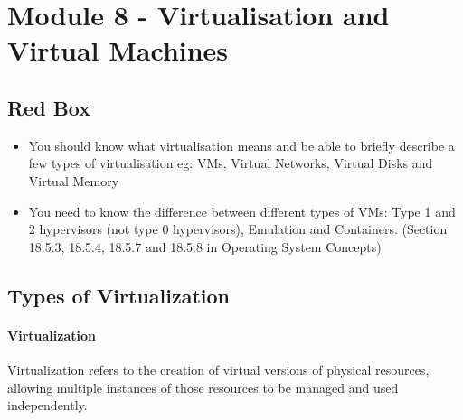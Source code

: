 \documentclass{article}
\begin{document}
\section{Module 8 - Virtualisation and Virtual Machines}
\subsection{Red Box}
\begin{itemize}
    \item You should know what virtualisation means and be able to briefly describe a few types of virtualisation eg: VMs,
    Virtual Networks, Virtual Disks and Virtual Memory
    \item You need to know the difference between different types of VMs: Type 1 and 2 hypervisors (not type 0
    hypervisors), Emulation and Containers. (Section 18.5.3, 18.5.4, 18.5.7 and 18.5.8 in Operating System Concepts)
\end{itemize}

\subsection{Types of Virtualization}

\paragraph{Virtualization}
Virtualization refers to the creation of virtual versions of physical resources, allowing multiple instances of those resources to be managed and used independently.
\end{document}
